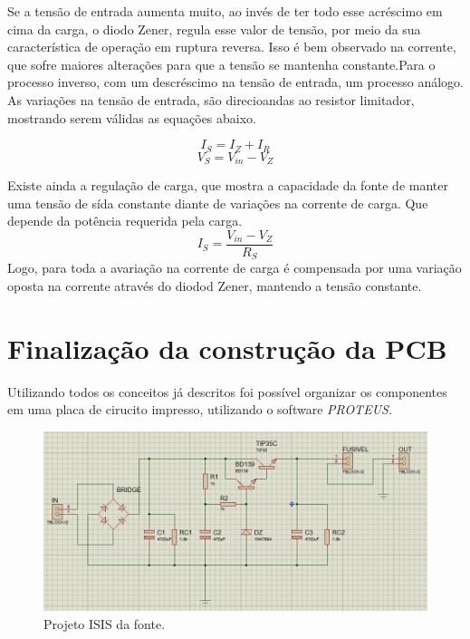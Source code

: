 \documentclass[a4paper,12pt,oneside,openany,table,xcdraw]{article}
\begin{document}
Se a tensão de entrada aumenta muito, ao invés de ter todo esse acréscimo em cima da carga, o diodo Zener, regula esse valor de tensão, por meio da sua característica de operação em ruptura reversa. Isso é bem observado na corrente, que sofre maiores alterações para que a tensão se mantenha constante.Para o processo inverso, com um descréscimo na tensão de entrada, um processo análogo. As variações na tensão de entrada, são direcioandas ao resistor limitador, mostrando serem válidas as equações abaixo.

\begin{equation}
I_{S}  = I_{Z} +I_{R}  
\end{equation}
\begin{equation}
V_{S}  = V_{in} - V_{Z}
\end{equation}

Existe ainda a  regulação de carga, que mostra a capacidade da fonte de manter uma tensão de sída constante diante de variações na corrente de carga. Que depende da potência requerida pela carga.
\begin{equation}
I_{S}  =\frac{ V_{in} - V_{Z}  }{R_{S}}
\end{equation}
Logo, para toda a avariação na corrente de carga é compensada por uma variação oposta na corrente através do diodod Zener, mantendo a tensão constante.

\section{Finalização da construção da PCB}
Utilizando todos os conceitos já descritos foi possível organizar os componentes em uma placa de cirucito impresso, utilizando o software \emph{PROTEUS}.
\begin{figure}[H]
\centering
\captionsetup{font=scriptsize}
\includegraphics[width=15cm]{isis}
\caption{Projeto ISIS da fonte.}
\label{isis}
\end{figure}
\end{document}
